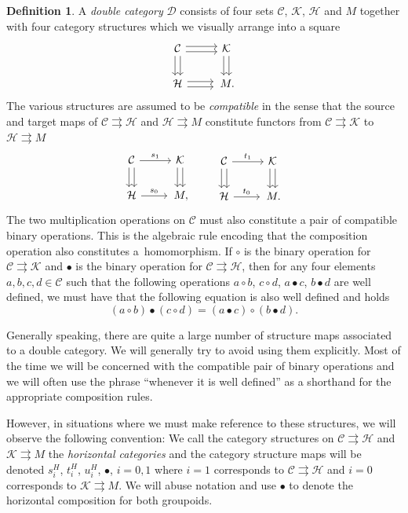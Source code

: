 \documentclass[10pt,a4paper]{amsart}
\numberwithin{equation}{section}
\theoremstyle{definition}
\newtheorem{Definition}[Theorem]{Definition}
\newcommand{\CC}{\mathcal{C}}
\newcommand{\CH}{\mathcal{H}}
\newcommand{\CK}{\mathcal{K}}
\newcommand{\CD}{\mathcal{D}}
\newcommand{\darrow}{\arrow[d, shift right] \arrow[d, shift left]}
\newcommand{\rarrow}{\arrow[r, shift right] \arrow[r, shift left]}
\newcommand{\grpd}{\rightrightarrows}
\begin{document}
\begin{Definition}
  A \emph{double category} $ \CD $ consists of four sets $\CC$, $\CK$, $\CH$ and $M$ together with four category structures which we visually arrange into a square
 \[\begin{tikzcd}
\CC \darrow \rarrow & \CK \darrow \\
\CH \rarrow &\, M.
\end{tikzcd}\]
The various structures are assumed to be \emph{compatible} in the sense that the source and target maps of $ \CC \grpd \CH $ and $ \CH \grpd M $ constitute functors from $ \CC \grpd \CK$ to $ \CH \grpd M $
  \[
  \begin{tikzcd}
    \CC \darrow \arrow[r, "s_1"] & \CK \darrow \\
    \CH \arrow[r, "s_0"] &\, M,
  \end{tikzcd}
  \qquad
  \begin{tikzcd}
    \CC \darrow \arrow[r, "t_1"] & \CK \darrow \\
    \CH \arrow[r, "t_0"] &\, M.
  \end{tikzcd}
  \]
The two multiplication operations on $ \CC $ must also constitute a pair of compatible binary operations. This is the algebraic rule encoding that the composition operation also constitutes a~homomorphism. If $ \circ $ is the binary operation for $ \CC \grpd \CK $ and $ \bullet $ is the binary operation for $ \CC \grpd \CH $, then for any four elements $ a,b,c,d \in \CC $ such that the following operations
$a \circ b$, $c \circ d$, $a \bullet c$, $b \bullet d$ are well defined,
we must have that the following equation is also well defined and holds
\begin{equation}\label{eqn:intertwininglaw}
(a \circ b) \bullet (c \circ d) = (a \bullet c) \circ (b \bullet d).
\end{equation}
\end{Definition}
Generally speaking, there are quite a large number of structure maps associated to a double category. We will generally try to avoid using them explicitly. Most of the time we will be concerned with the compatible pair of binary operations and we will often use the phrase ``whenever it is well defined'' as a shorthand for the appropriate composition rules.

However, in situations where we must make reference to these structures, we will observe the following convention: We call the category structures on $ \CC \grpd \CH $ and $ \CK \grpd M $ the \emph{horizontal categories} and the category structure maps will be denoted
$s^H_{i}$, $t^H_{i}$, $u^H_i$, $\bullet$, $i = 0,1$
where $ i = 1$ corresponds to $ \CC \grpd \CH $ and $ i= 0 $ corresponds to $ \CK \grpd M$. We will abuse notation and use $ \bullet $ to denote the horizontal composition for both groupoids.
\end{document}
